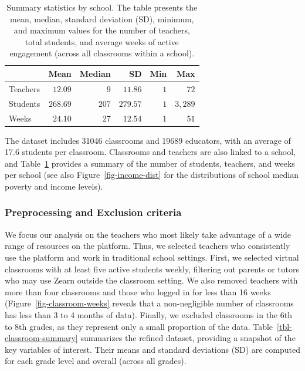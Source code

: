 \documentclass[
  number,
  preprint,
  3p,
  onecolumn]{elsarticle}
\begin{document}
\begin{longtable}{l|rrrrr}

\caption{\label{tbl-summary}Summary statistics by school. The table
presents the mean, median, standard deviation (SD), minimum, and maximum
values for the number of teachers, total students, and average weeks of
active engagement (across all classrooms within a school).}

\tabularnewline

\toprule
\multicolumn{1}{l}{} & Mean & Median & SD & Min & Max \\ 
\midrule\addlinespace[2.5pt]
Teachers & $12.09$ & $9$ & $11.86$ & $1$ & $72$ \\ 
Students & $268.69$ & $207$ & $279.57$ & $1$ & $3,289$ \\ 
Weeks & $24.10$ & $27$ & $12.54$ & $1$ & $51$ \\ 
\bottomrule

\end{longtable}

The dataset includes 31046 classrooms and 19689 educators, with an
average of 17.6 students per classroom. Classrooms and teachers are also
linked to a school, and Table~\ref{tbl-summary} provides a summary of
the number of students, teachers, and weeks per school (see also
Figure~\ref{fig-income-dist} for the distributions of school median
poverty and income levels).

\subsubsection{Preprocessing and Exclusion
criteria}\label{preprocessing-and-exclusion-criteria}

We focus our analysis on the teachers who most likely take advantage of
a wide range of resources on the platform. Thus, we selected teachers
who consistently use the platform and work in traditional school
settings. First, we selected virtual classrooms with at least five
active students weekly, filtering out parents or tutors who may use
Zearn outside the classroom setting. We also removed teachers with more
than four classrooms and those who logged in for less than 16 weeks
(Figure~\ref{fig-classroom-weeks} reveals that a non-negligible number
of classrooms has less than 3 to 4 months of data). Finally, we excluded
classrooms in the 6th to 8th grades, as they represent only a small
proportion of the data. Table~\ref{tbl-classroom-summary} summarizes the
refined dataset, providing a snapshot of the key variables of interest.
Their means and standard deviations (SD) are computed for each grade
level and overall (across all grades).
\end{document}

